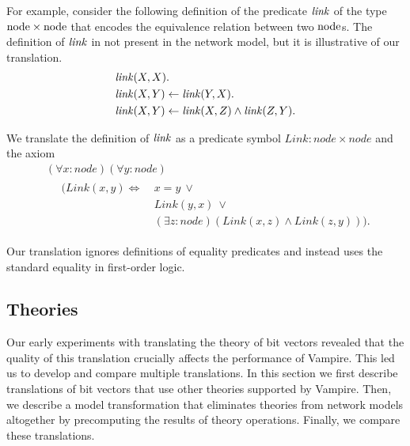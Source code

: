 For example, consider the following definition of the predicate $\mathit{link}$ of the type $\mathrm{node} \times \mathrm{node}$ that encodes the equivalence relation between two $\mathrm{node}$s. The definition of $\mathit{link}$ in not present in the network model, but it is illustrative of our translation.
\begin{equation*}
\begin{aligned}
&\mathit{link}(X,X).\\
&\mathit{link}(X,Y)\leftarrow\mathit{link}(Y,X).\\
&\mathit{link}(X,Y)\leftarrow\mathit{link}(X,Z)\wedge\mathit{link}(Z,Y).
\end{aligned}
\end{equation*}

We translate the definition of $\mathit{link}$ as a predicate symbol $\mathit{Link}: \mathit{node} \times \mathit{node}$ and the axiom
\begin{equation*}
\begin{aligned}
&(\forall x:\mathit{node})(\forall y:\mathit{node})\\
&\quad
 \begin{aligned}
  (\mathit{Link}(x,y)\Leftrightarrow\:&x=y\:\vee\:\\
                                      &Link(y,x)\:\vee\:\\
                                      &(\exists z:\mathit{node})(\mathit{Link}(x,z)\wedge\mathit{Link}(z,y))).
 \end{aligned}
\end{aligned}
\end{equation*}

Our translation ignores definitions of equality predicates and instead uses the standard equality in first-order logic. %

\subsection{Theories}
\label{sect:aws/fol/theories}
Our early experiments with translating the theory of bit vectors revealed that the quality of this translation crucially affects the performance of Vampire. This led us to develop and compare multiple translations. In this section we first describe translations of bit vectors that use other theories supported by Vampire. Then, we describe a model transformation that eliminates theories from network models altogether by precomputing the results of theory operations. Finally, we compare these translations.

